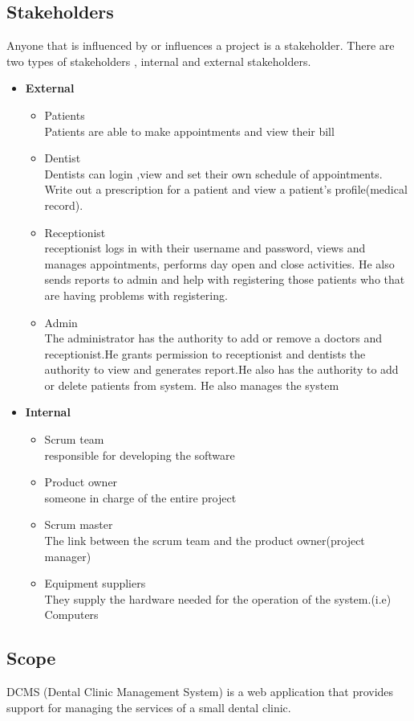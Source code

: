 \documentclass[11 pt]{article}
\begin{document}
\subsection{Stakeholders}
Anyone that is influenced by or influences a project is a stakeholder. There are two types of stakeholders , internal and external stakeholders.
\begin{itemize}
\item \textbf{External}
\begin{itemize}
\item Patients\\
Patients are able to make appointments and view their bill
\item Dentist\\
Dentists can login ,view and set their own schedule of appointments. Write out a prescription for a patient and view a patient's profile(medical record).
\item Receptionist\\
receptionist logs in with their username and password, views and manages appointments, performs day open and close activities. He also sends reports to admin and help with registering those patients who that are having problems with registering.
\item Admin \\
The administrator has the authority to add or remove a doctors and receptionist.He grants permission to receptionist and dentists the authority to view and generates report.He also has the authority to add or delete patients from system. He also manages the system
\end{itemize}
\item \textbf{Internal}
\begin{itemize}
\item Scrum team \\
responsible for developing the software
\item Product owner\\
someone in charge of the entire project
\item Scrum master \\
The link between the scrum team and the product owner(project manager)
\item Equipment suppliers \\
They supply the hardware needed for the operation of the system.(i.e) Computers
\end{itemize}
\end{itemize}
\subsection{Scope}
DCMS (Dental Clinic Management System) is a web application that provides support for managing the services of a small dental clinic.
\end{document}
